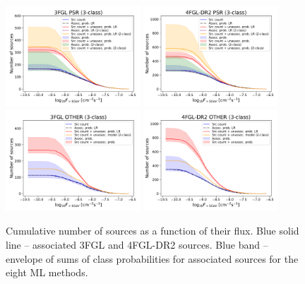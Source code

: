 \documentclass{aa}
\begin{document}
\begin{figure}[h]
\centering
\includegraphics[width=0.45\textwidth]{plots/N_logS_3FGL_PSR_3classes.pdf}
\includegraphics[width=0.45\textwidth]{plots/N_logS_4FGL-DR2_PSR_3classes.pdf} \\
\includegraphics[width=0.45\textwidth]{plots/N_logS_3FGL_OTHER_3classes.pdf}
\includegraphics[width=0.45\textwidth]{plots/N_logS_4FGL-DR2_OTHER_3classes.pdf}
\caption{Cumulative number of sources as a function of their flux. 
Blue solid line -- associated 3FGL and 4FGL-DR2  sources. 
Blue band -- envelope of sums of class probabilities for associated sources for the eight ML methods. 
}
\end{figure}
\end{document}
